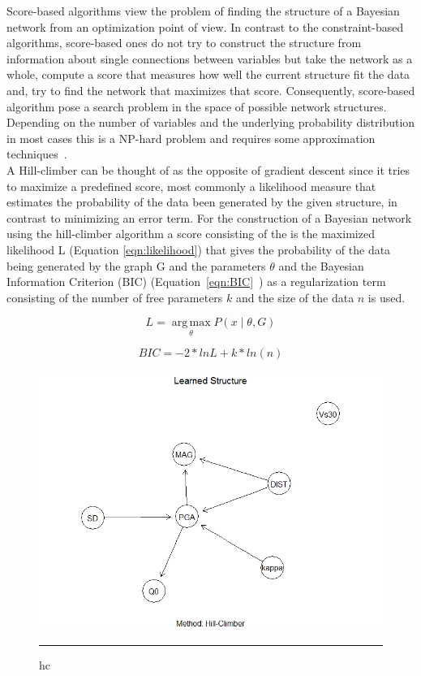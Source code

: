 Score-based algorithms view the problem of finding the structure of a Bayesian network from an optimization point of view. In contrast to the constraint-based algorithms, score-based ones do not try to construct the structure from information about single connections between variables but take the network as a whole, compute a score that measures how well the current structure fit the data and, try to find the network that maximizes that score. Consequently, score-based algorithm pose a search problem in the space of possible network structures. Depending on the number of variables and the underlying probability distribution in most cases this is a NP-hard problem and requires some approximation techniques~\citep{koller2009}. \\
A Hill-climber can be thought of as the opposite of gradient descent since it tries to maximize a predefined score, most commonly a likelihood measure that estimates the probability of the data been generated by the given structure, in contrast to minimizing an error term. For the construction of a Bayesian network using the hill-climber algorithm a score consisting of the is the maximized likelihood L (Equation \ref{eqn:likelihood}) that gives the probability of the data being generated by the graph G and the parameters $\theta$ and the Bayesian Information Criterion (BIC) (Equation~\ref{eqn:BIC}~\citep{schwarz}) as a regularization term consisting of the number of free parameters $k$ and the size of the data $n$ is used.

\begin{equation}
L = \operatorname*{arg\,max}_\theta P(x\mid \theta, G)
\label{eqn:likelihood}
\end{equation}

\begin{equation}
BIC = -2*ln L + k* ln(n)
\label{eqn:BIC}
\end{equation}


\begin{figure}[htbp]%
	\centering
		\includegraphics[scale=0.5]{Figures/hc_one.png}
		\rule{35em}{0.5pt}
	\caption[Score-based Hill-Climber Network]{hc}
	\label{fig:hc}
\end{figure}

